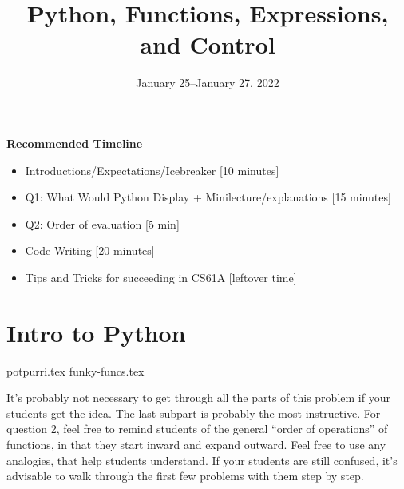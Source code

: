 \documentclass{exam}
\title{Python, Functions, Expressions, and Control}
\date{January 25--January 27, 2022}
\begin{document}
\maketitle
\begin{meta}
\textbf{Recommended Timeline}
\begin{itemize}
  \item Introductions/Expectations/Icebreaker [10 minutes]
  \item Q1: What Would Python Display + Minilecture/explanations [15 minutes]
  \item Q2: Order of evaluation [5 min]
  \item Code Writing [20 minutes]
  \item Tips and Tricks for succeeding in CS61A [leftover time]
\end{itemize}
\end{meta}


\section{Intro to Python}
\begin{questions}
{potpurri.tex}
{funky-funcs.tex}
\begin{questionmeta}
  It's probably not necessary to get through all the parts of this problem if your students get the idea. The last subpart is probably the most instructive. 
  For question 2, feel free to remind students of the general ``order of operations'' of functions, in that they start inward and expand outward. Feel free to use any analogies, that help students understand.
  If your students are still confused, it's advisable to walk through the first few problems with them step by step.
\end{questionmeta}
\end{questions}
\end{document}
